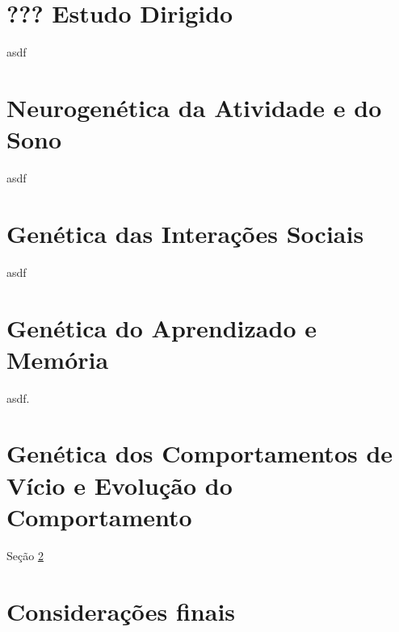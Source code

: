 \documentclass[
	article,			%
	12pt,				%
	oneside,			%
	a4paper,			%
	english,			%
	brazil,				%
	sumario=tradicional
	]{abntex2}
\begin{document}
\section{??? Estudo Dirigido}
\label{...}
asdf

\section{Neurogenética da Atividade e do Sono}
\label{neurogenetica}
asdf

\section{Genética das Interações Sociais}
\label{geneticadasinteracoes}
asdf

\section{Genética do Aprendizado e Memória}
\label{geneticadoaprendizado}
asdf.

\section{Genética dos Comportamentos de Vício e Evolução do Comportamento}
\label{viciosecomportamento}

Seção \ref{neurogenetica}



% 
\section*{Considerações finais}


\postextual







\end{document}
